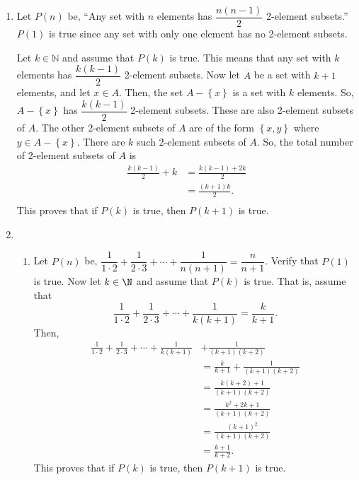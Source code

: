 \begin{enumerate}
\item Let $P \left( n \right)$ be, ``Any set with $n$ elements has 
$\dfrac{n \left( n - 1 \right)}{2}$ 2-element subsets.''  $P \left( 1 \right)$ is true since any set with only one element has no 2-element subsets.

Let $k \in \mathbb{N}$ and assume that $P \left( k \right)$ is true.  This means that any set with $k$ elements has $\dfrac{k \left( k - 1 \right)}{2}$ 2-element subsets.  Now let $A$ be a set with 
$k + 1$ elements, and let $x \in A$.  Then, the set $A - \left\{ x \right\}$ is a set with $k$ elements.  So, $A - \left\{ x \right\}$ has $\dfrac{k \left( k - 1 \right)}{2}$ 2-element subsets.  These are also 2-element subsets of $A$.  The other 2-element subsets of $A$ are of the form 
$\left\{ x, y \right\}$ where $y \in A - \left\{ x \right\}$.  There are $k$ such 2-element subsets of $A$.  So, the total number of 2-element subsets of $A$ is
\[
\begin{aligned}
\frac{k \left( k - 1 \right)}{2} + k &= \frac{k \left( k - 1 \right) +2k}{2} \\
                                     &= \frac{ \left( k + 1 \right) k}{2}. \\
\end{aligned}
\]
This proves that if $P \left( k \right)$ is true, then $P \left( k + 1 \right)$ is true.




%


\item \begin{enumerate}
\item Let $P(n)$ be, $\dfrac{1}{1 \cdot 2} + \dfrac{1}{2 \cdot 3} + \cdots + \dfrac{1}{n (n + 1 )} = \dfrac{n}{n+1}$.  Verify that $P(1)$ is true.  Now let $k \in \N$ and assume that $P(k)$ is true.  That is, assume that
\[
\frac{1}{1 \cdot 2} + \frac{1}{2 \cdot 3} + \cdots + \frac{1}{k (k + 1 )} = \frac{k}{k+1}.
\]
Then,
\begin{align*}
\frac{1}{1 \cdot 2} + \frac{1}{2 \cdot 3} + \cdots + \frac{1}{k (k + 1 )} &+ \frac{1}{(k + 1)(k + 2)} \\
 &=  \frac{k}{k+1} + \frac{1}{(k + 1)(k + 2)} \\
 &= \frac{k(k + 2) + 1}{(k + 1)(k + 2)} \\
 &= \frac{k^2 + 2k + 1}{(k + 1)(k + 2)} \\
 &= \frac{(k + 1)^2}{(k + 1)(k + 2)} \\
 &= \frac{k + 1}{k + 2}.
\end{align*}
This proves that if $P(k)$ is true, then $P(k + 1)$ is true.


\end{enumerate}
\end{enumerate}
